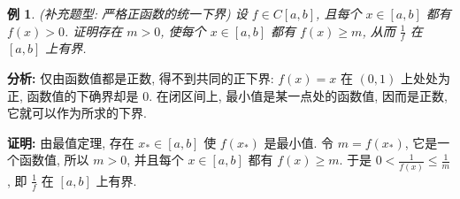 \documentclass[UTF8,openany]{ctexbook}
\theoremstyle{chinesetextbook}
\newtheorem{example}{例}[section]
\newenvironment{cnproof}{\par\indent\textbf{证明:} \ignorespaces}{\par}
\begin{document}
\begin{example}
\textnormal{(补充题型: 严格正函数的统一下界)} 设 $f\in C[a,b]$, 且每个 $x\in[a,b]$ 都有 $f(x)>0$. 证明存在 $m>0$, 使每个 $x\in[a,b]$ 都有 $f(x)\ge m$, 从而 $\displaystyle\frac1f$ 在 $[a,b]$ 上有界.
\end{example}
\par\indent\textbf{分析:} 仅由函数值都是正数, 得不到共同的正下界: $f(x)=x$ 在 $(0,1)$ 上处处为正, 函数值的下确界却是 $0$. 在闭区间上, 最小值是某一点处的函数值, 因而是正数, 它就可以作为所求的下界.
\begin{cnproof}
由最值定理, 存在 $x_*\in[a,b]$ 使 $f(x_*)$ 是最小值. 令 $m=f(x_*)$, 它是一个函数值, 所以 $m>0$, 并且每个 $x\in[a,b]$ 都有 $f(x)\ge m$. 于是 $\displaystyle0<\frac1{f(x)}\le\frac1m$, 即 $\displaystyle\frac1f$ 在 $[a,b]$ 上有界.
\end{cnproof}
\end{document}
